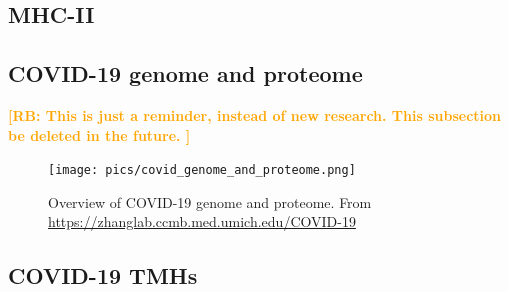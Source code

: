 \documentclass{article}
\newcommand{\richel}[1]{\textcolor{orange}{\textbf{[RB: #1]}}}
\begin{document}
\subsection{MHC-II}

\begin{table}
  
  \caption{
    Percentage of MHC-II epitopes overlapping with transmembrane helix.
    \richel{This is simulated data}
  }
  \label{table:bbbq_2_percentages}
\end{table}

\begin{table}
  
  \caption{
    Kolmogorov-Smirnov test results comparing human and COVID-19 for MHC-II
    \richel{Done on the simulated data}
  }
  \label{table:bbbq_2_stats_covid}
\end{table}

\begin{table}
  
  \caption{
    Kolmogorov-Smirnov test results comparing human and Mycobacterium for MHC-II
    \richel{Done on the simulated data}
  }
  \label{table:bbbq_2_stats_myco}
\end{table}

\subsection{COVID-19 genome and proteome}

\richel{
  This is just a reminder, instead of new research. 
  This subsection be deleted in the future.
}

\begin{figure}[!htbp]
  \texttt{[image: pics/covid\_genome\_and\_proteome.png]}
  \caption{
    Overview of COVID-19 genome and proteome.
    From 
    \url{https://zhanglab.ccmb.med.umich.edu/COVID-19}
  }
  \label{fig:covid_genome_and_proteome}
\end{figure}

\subsection{COVID-19 TMHs}
\end{document}
